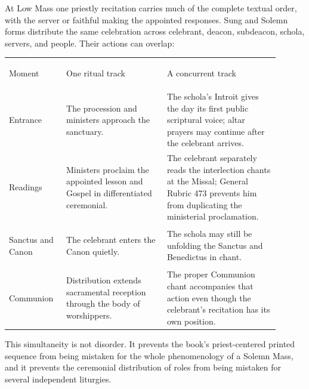 At Low Mass one priestly recitation carries much of the complete textual order, with the server or faithful making the appointed responses. Sung and Solemn forms distribute the same celebration across celebrant, deacon, subdeacon, schola, servers, and people. Their actions can overlap:

\begin{longtable}{>{\bfseries\raggedright\arraybackslash}p{0.18\linewidth}>{\raggedright\arraybackslash}p{0.34\linewidth}>{\raggedright\arraybackslash}p{0.38\linewidth}}
Moment & One ritual track & A concurrent track\\
Entrance & The procession and ministers approach the sanctuary. & The schola's Introit gives the day its first public scriptural voice; altar prayers may continue after the celebrant arrives.\\
Readings & Ministers proclaim the appointed lesson and Gospel in differentiated ceremonial. & The celebrant separately reads the interlection chants at the Missal; General Rubric 473 prevents him from duplicating the ministerial proclamation.\\
Sanctus and Canon & The celebrant enters the Canon quietly. & The schola may still be unfolding the Sanctus and Benedictus in chant.\\
Communion & Distribution extends sacramental reception through the body of worshippers. & The proper Communion chant accompanies that action even though the celebrant's recitation has its own position.\\
\end{longtable}

This simultaneity is not disorder. It prevents the book's priest-centered printed sequence from being mistaken for the whole phenomenology of a Solemn Mass, and it prevents the ceremonial distribution of roles from being mistaken for several independent liturgies.
